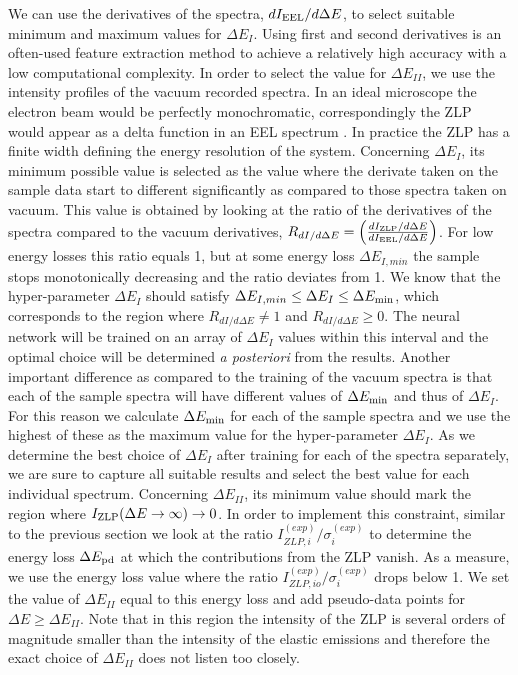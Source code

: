 We can use the derivatives of the spectra, $dI_{\rm EEL}/d\Delta E$, to select suitable minimum and
maximum values for $\Delta E_I$. 
%
Using first and second derivatives is an often-used feature extraction method to achieve a relatively 
high accuracy with a low computational complexity. 
%
In order to select the value for $\Delta E_{II}$, we use the intensity
profiles of the vacuum recorded spectra. 
%
In an ideal microscope the electron beam would be perfectly monochromatic, 
correspondingly the ZLP would appear as a delta function in an EEL spectrum \cite{Rafferty:2000}. 
%
In practice the ZLP has a finite width defining the energy resolution of the system. 
%
Concerning $\Delta E_I $, its minimum possible value is selected as the value where the derivate taken on the sample
data start to different significantly as compared to those spectra taken on vacuum.
%
This value is obtained by looking at the ratio of the derivatives of the spectra compared to the vacuum derivatives,
$R_{dI/d \Delta E} =  \left( \frac{dI_{\rm ZLP}/d\Delta E}{dI_{\rm EEL}/d\Delta E}\right)$. 
%
For low energy losses this ratio equals 1, but at some energy loss $\Delta E_{I,min}$ the
sample stops monotonically decreasing and the ratio deviates from 1. 
%
We know that the hyper-parameter $\Delta E_I$ should satisfy $\Delta E_{I,min} \le \Delta E_I \le \Delta E_{\rm min}$,
which corresponds to the region where $R_{dI/d \Delta E} \ne  1$ and $R_{dI/d \Delta E} \ge 0$.
%
The neural network will be trained on an array of $\Delta E_I$ values within this interval and 
the optimal choice will be determined {\it a posteriori} from the results.
%
Another important difference as compared to the training of the vacuum spectra is that each of the sample
spectra will have different values of $\Delta E_{\rm min}$ and thus of $\Delta E_I$. 
%
For this reason we calculate $\Delta E_{\rm min}$  for each of the sample spectra and we use the highest of these
as the maximum value for the hyper-parameter $\Delta E_I$. 
%
As we determine the best choice of $\Delta E_I$ after training for each of the spectra separately, 
we are sure to capture all suitable results and select the best value for each individual spectrum. 
%
Concerning $\Delta E_{II}$, its minimum value should mark the region where $I_{\rm ZLP}(\Delta E\to \infty)\to 0$. 
%
In order to implement this constraint, similar to the previous section we look at the ratio 
$I_{ZLP,i}^{(exp)}/ \sigma_i^{(exp)}$ to determine the energy loss $\Delta E_{\rm pd}$ at 
which the contributions from the ZLP vanish. 
%
As a measure, we use the energy loss value where the ratio $I_{ZLP,io}^{(exp)}/\sigma_i^{(exp)}$ drops below 1. 
%
We set the value of $\Delta E_{II}$ equal to this energy loss and add pseudo-data points for $\Delta E \ge \Delta E_{II}$.
%
Note that in this region the intensity of the ZLP is several orders of magnitude smaller than the intensity 
of the elastic emissions and therefore the exact choice of $\Delta E_{II}$ does not listen too closely.

